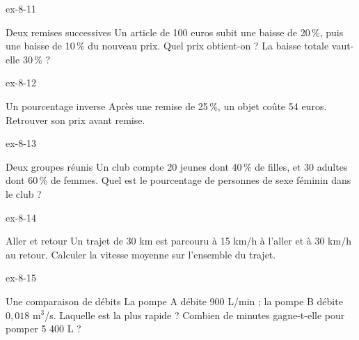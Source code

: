 \begin{blocLivre}{ex-8-11}\begin{exercice}[3]{Deux remises successives}
Un article de 100 euros subit une baisse de 20\,\%, puis une baisse de 10\,\% du nouveau prix. Quel prix obtient-on ? La baisse totale vaut-elle 30\,\% ?
\end{exercice}\end{blocLivre}
\begin{blocLivre}{ex-8-12}\begin{exercice}[3]{Un pourcentage inverse}
Après une remise de 25\,\%, un objet coûte 54 euros. Retrouver son prix avant remise.
\end{exercice}\end{blocLivre}
\begin{blocLivre}{ex-8-13}\begin{exercice}[3]{Deux groupes réunis}
Un club compte 20 jeunes dont 40\,\% de filles, et 30 adultes dont 60\,\% de femmes. Quel est le pourcentage de personnes de sexe féminin dans le club ?
\end{exercice}\end{blocLivre}
\begin{blocLivre}{ex-8-14}\begin{exercice}[3]{Aller et retour}
Un trajet de 30 km est parcouru à 15 km/h à l’aller et à 30 km/h au retour. Calculer la vitesse moyenne sur l’ensemble du trajet.
\end{exercice}\end{blocLivre}
\begin{blocLivre}{ex-8-15}\begin{exercice}[3]{Une comparaison de débits}
La pompe A débite 900 L/min ; la pompe B débite $0{,}018$ m$^3$/s. Laquelle est la plus rapide ? Combien de minutes gagne-t-elle pour pomper 5 400 L ?
\end{exercice}\end{blocLivre}

\clearpage
